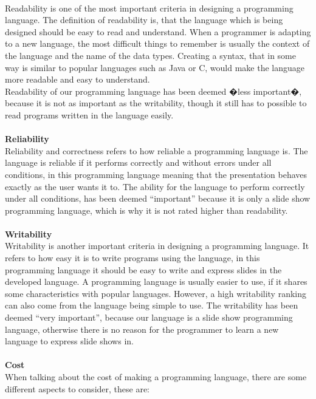  \\
Readability is one of the most important criteria in designing a programming language. The definition of readability is, that the language which is being designed should be easy to read and understand. When a programmer is adapting to a new language, the most difficult things to remember is usually the context of the language and the name of the data types. Creating a syntax, that in some way is similar to popular languages such as Java or C, would make the language more readable and easy to understand. \\
Readability of our programming language has been deemed �less important�, because it is not as important as the writability, though it still has to possible to read programs written in the language easily.
\\ \\
\textbf{Reliability} \\
Reliability and correctness refers to how reliable a programming language is. The language is reliable if it performs correctly and without errors under all conditions, in this programming language meaning that the presentation behaves exactly as the user wants it to. The ability for the language to perform correctly under all conditions, has been deemed ``important'' because it is only a slide show programming language, which is why it is not rated higher than readability.
\\ \\
\textbf{Writability} \\
Writability is another important criteria in designing a programming language. It refers to how easy it is to write programs using the language, in this programming language it should be easy to write and express slides in the developed language. A programming language is usually easier to use, if it shares some characteristics with popular languages. However, a high writability ranking can also come from the language being simple to use. The writability has been deemed ``very important'', because our language is a slide show programming language, otherwise there is no reason for the programmer to learn a new language to express slide shows in.
\\ \\
\textbf{Cost} \\
When talking about the cost of making a programming language, there are some different aspects to consider, these are:
